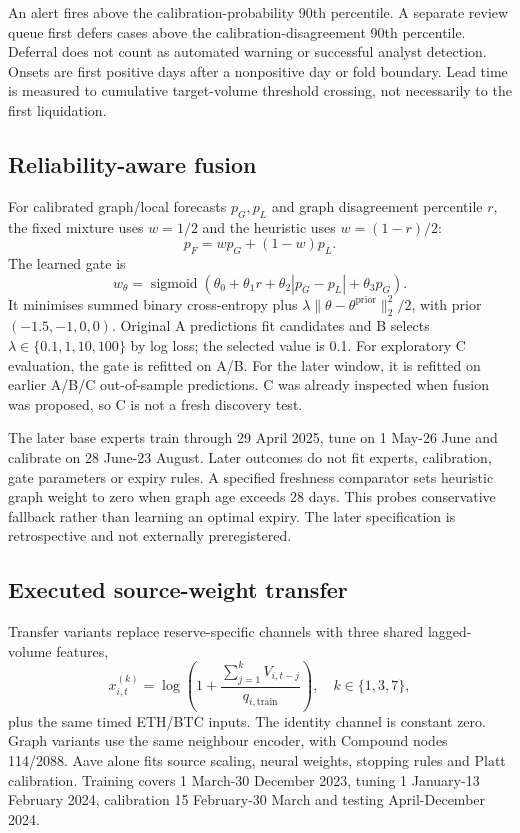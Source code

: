 \documentclass[
  10pt,
  a4paper,
]{article}
\begin{document}
An alert fires above the calibration-probability 90th percentile. A
separate review queue first defers cases above the
calibration-disagreement 90th percentile. Deferral does not count as
automated warning or successful analyst detection. Onsets are first
positive days after a nonpositive day or fold boundary. Lead time is
measured to cumulative target-volume threshold crossing, not necessarily
to the first liquidation.

\subsection{Reliability-aware fusion}\label{reliability-aware-fusion}

For calibrated graph/local forecasts \(p_G,p_L\) and graph disagreement
percentile \(r\), the fixed mixture uses \(w=1/2\) and the heuristic
uses \(w=(1-r)/2\): \[p_F=w p_G+(1-w)p_L.\] The learned gate is
\[w_\theta=\operatorname{sigmoid}(\theta_0+\theta_1r+\theta_2|p_G-p_L|+\theta_3p_G).\]
It minimises summed binary cross-entropy plus
\(\lambda\|\theta-\theta^{\mathrm{prior}}\|_2^2/2\), with prior
\((-1.5,-1,0,0)\). Original A predictions fit candidates and B selects
\(\lambda\in\{0.1,1,10,100\}\) by log loss; the selected value is 0.1.
For exploratory C evaluation, the gate is refitted on A/B. For the later
window, it is refitted on earlier A/B/C out-of-sample predictions. C was
already inspected when fusion was proposed, so C is not a fresh
discovery test.

The later base experts train through 29 April 2025, tune on 1 May-26
June and calibrate on 28 June-23 August. Later outcomes do not fit
experts, calibration, gate parameters or expiry rules. A specified
freshness comparator sets heuristic graph weight to zero when graph age
exceeds 28 days. This probes conservative fallback rather than learning
an optimal expiry. The later specification is retrospective and not
externally preregistered.

\subsection{Executed source-weight
transfer}\label{executed-source-weight-transfer}

Transfer variants replace reserve-specific channels with three shared
lagged-volume features,
\[x_{i,t}^{(k)}=\log\left(1+\frac{\sum_{j=1}^{k}V_{i,t-j}}{q_{i,\mathrm{train}}}\right),\quad k\in\{1,3,7\},\]
plus the same timed ETH/BTC inputs. The identity channel is constant
zero. Graph variants use the same neighbour encoder, with Compound nodes
114/2088. Aave alone fits source scaling, neural weights, stopping rules
and Platt calibration. Training covers 1 March-30 December 2023, tuning
1 January-13 February 2024, calibration 15 February-30 March and testing
April-December 2024.
\end{document}
